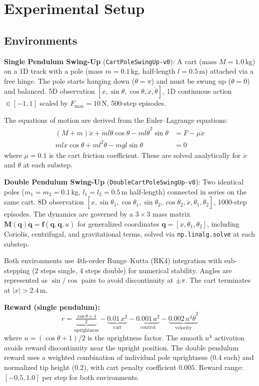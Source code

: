 \documentclass[11pt,a4paper]{article}
\begin{document}
\section{Experimental Setup}

\subsection{Environments}

\textbf{Single Pendulum Swing-Up} (\texttt{CartPoleSwingUp-v0}): A cart (mass $M=1.0$\,kg) on a 1D track with a pole (mass $m=0.1$\,kg, half-length $l=0.5$\,m) attached via a free hinge. The pole starts hanging down ($\theta=\pi$) and must be swung up ($\theta=0$) and balanced. 5D observation $[x, \sin\theta, \cos\theta, \dot{x}, \dot{\theta}]$, 1D continuous action $\in [-1,1]$ scaled by $F_{\max}=10$\,N, 500-step episodes.

The equations of motion are derived from the Euler--Lagrange equations:
\begin{align}
(M + m)\ddot{x} + ml\ddot{\theta}\cos\theta - ml\dot{\theta}^2\sin\theta &= F - \mu\dot{x} \\
ml\ddot{x}\cos\theta + ml^2\ddot{\theta} - mgl\sin\theta &= 0
\end{align}
where $\mu=0.1$ is the cart friction coefficient. These are solved analytically for $\ddot{x}$ and $\ddot{\theta}$ at each substep.

\textbf{Double Pendulum Swing-Up} (\texttt{DoubleCartPoleSwingUp-v0}): Two identical poles ($m_1=m_2=0.1$\,kg, $l_1=l_2=0.5$\,m half-length) connected in series on the same cart. 8D observation $[x, \sin\theta_1, \cos\theta_1, \sin\theta_2, \cos\theta_2, \dot{x}, \dot{\theta}_1, \dot{\theta}_2]$, 1000-step episodes. The dynamics are governed by a $3\times 3$ mass matrix $\mathbf{M}(\mathbf{q})\ddot{\mathbf{q}} = \mathbf{f}(\mathbf{q}, \dot{\mathbf{q}}, u)$ for generalized coordinates $\mathbf{q} = [x, \theta_1, \theta_2]$, including Coriolis, centrifugal, and gravitational terms, solved via \texttt{np.linalg.solve} at each substep.

Both environments use 4th-order Runge--Kutta (RK4) integration with sub-stepping (2 steps single, 4 steps double) for numerical stability. Angles are represented as $\sin/\cos$ pairs to avoid discontinuity at $\pm\pi$. The cart terminates at $|x| > 2.4$\,m.

\textbf{Reward (single pendulum):}
\begin{equation}
r = \underbrace{\tfrac{\cos\theta + 1}{2}}_{\text{uprightness}} - \underbrace{0.01\,x^2}_{\text{cart}} - \underbrace{0.001\,a^2}_{\text{control}} - \underbrace{0.002\,u^4\dot{\theta}^2}_{\text{velocity}}
\end{equation}
where $u = (\cos\theta+1)/2$ is the uprightness factor. The smooth $u^4$ activation avoids reward discontinuity near the upright position. The double pendulum reward uses a weighted combination of individual pole uprightness ($0.4$ each) and normalized tip height ($0.2$), with cart penalty coefficient $0.005$. Reward range: $[-0.5, 1.0]$ per step for both environments.
\end{document}
